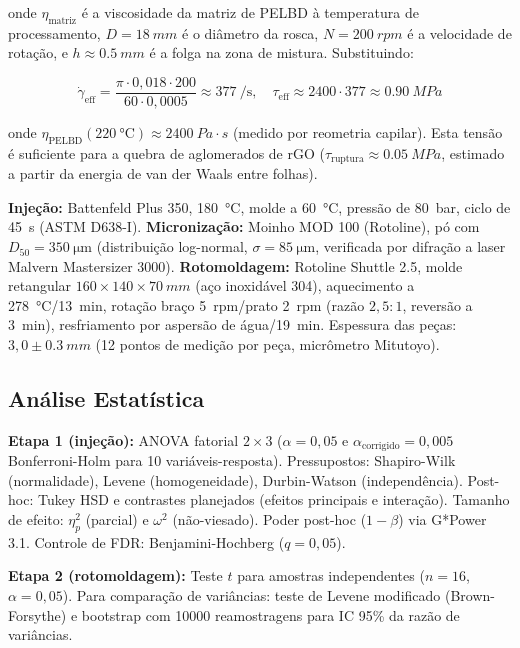 \documentclass[12pt,a4paper,twoside]{article}
\begin{document}
onde $\eta_{\text{matriz}}$ é a viscosidade da matriz de PELBD à temperatura de processamento, $D = \SI{18}{mm}$ é o diâmetro da rosca, $N = \SI{200}{rpm}$ é a velocidade de rotação, e $h \approx \SI{0,5}{mm}$ é a folga na zona de mistura. Substituindo:

\begin{equation}
\dot{\gamma}_{\text{eff}} = \frac{\pi \cdot 0,018 \cdot 200}{60 \cdot 0,0005} \approx \SI{377}{\per\second}, \quad \tau_{\text{eff}} \approx 2400 \cdot 377 \approx \SI{0,90}{MPa}
\end{equation}

onde $\eta_{\text{PELBD}}(\SI{220}{\celsius}) \approx \SI{2400}{Pa\cdot s}$ (medido por reometria capilar). Esta tensão é suficiente para a quebra de aglomerados de rGO ($\tau_{\text{ruptura}} \approx \SI{0,05}{MPa}$, estimado a partir da energia de van der Waals entre folhas).

\textbf{Injeção:} Battenfeld Plus 350, \SI{180}{\celsius}, molde a \SI{60}{\celsius}, pressão de \SI{80}{bar}, ciclo de \SI{45}{s} (ASTM D638-I). \textbf{Micronização:} Moinho MOD 100 (Rotoline), pó com $D_{50} = \SI{350}{\micro\meter}$ (distribuição log-normal, $\sigma = \SI{85}{\micro\meter}$, verificada por difração a laser Malvern Mastersizer 3000). \textbf{Rotomoldagem:} Rotoline Shuttle 2.5, molde retangular $160 \times 140 \times \SI{70}{mm}$ (aço inoxidável 304), aquecimento a \SI{278}{\celsius}/\SI{13}{min}, rotação braço \SI{5}{rpm}/prato \SI{2}{rpm} (razão $2,5:1$, reversão a \SI{3}{min}), resfriamento por aspersão de água/\SI{19}{min}. Espessura das peças: $3,0 \pm \SI{0,3}{mm}$ (12 pontos de medição por peça, micrômetro Mitutoyo).

\subsection{Análise Estatística}

\textbf{Etapa 1 (injeção):} ANOVA fatorial $2\times3$ ($\alpha=0,05$ e $\alpha_{\text{corrigido}}=0,005$ Bonferroni-Holm para 10 variáveis-resposta). Pressupostos: Shapiro-Wilk (normalidade), Levene (homogeneidade), Durbin-Watson (independência). Post-hoc: Tukey HSD e contrastes planejados (efeitos principais e interação). Tamanho de efeito: $\eta^2_p$ (parcial) e $\omega^2$ (não-viesado). Poder post-hoc ($1-\beta$) via G*Power 3.1. Controle de FDR: Benjamini-Hochberg ($q=0,05$).

\textbf{Etapa 2 (rotomoldagem):} Teste $t$ para amostras independentes ($n=16$, $\alpha=0,05$). Para comparação de variâncias: teste de Levene modificado (Brown-Forsythe) e bootstrap com \num{10000} reamostragens para IC 95\% da razão de variâncias.
\end{document}
